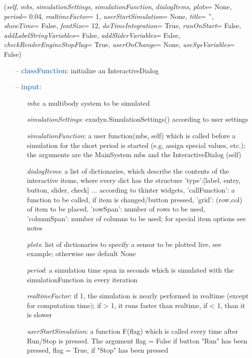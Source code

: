 \begin{itemize}[leftmargin=1.4cm]
\begin{itemize}[leftmargin=1.4cm]
\begin{itemize}[leftmargin=1.4cm]
\begin{itemize}[leftmargin=0.5cm]
\begin{itemize}[leftmargin=1.4cm]
\begin{itemize}[leftmargin=1.4cm]
\begin{itemize}[leftmargin=0.5cm]
\begin{itemize}[leftmargin=1.4cm]
\begin{itemize}[leftmargin=0.5cm]
\begin{itemize}[leftmargin=1.4cm]
\begin{itemize}[leftmargin=1.4cm]
\begin{flushleft}
({\it self}, {\it mbs}, {\it simulationSettings}, {\it simulationFunction}, {\it dialogItems}, {\it plots}= None, {\it period}= 0.04, {\it realtimeFactor}= 1, {\it userStartSimulation}= None, {\it title}= '', {\it showTime}= False, {\it fontSize}= 12, {\it doTimeIntegration}= True, {\it runOnStart}= False, {\it addLabelStringVariables}= False, {\it addSliderVariables}= False, {\it checkRenderEngineStopFlag}= True, {\it userOnChange}= None, {\it useSysVariables}= False)
\end{flushleft}
\setlength{\itemindent}{0.7cm}
\begin{itemize}[leftmargin=0.7cm]
\item[--]\textcolor{steelblue}{\bf classFunction}: initialize an InteractiveDialog
\item[--]\textcolor{steelblue}{\bf input}: \vspace{-6pt}
\begin{itemize}[leftmargin=1.2cm]
\setlength{\itemindent}{-0.7cm}
\item[]{\it mbs}: a multibody system to be simulated
\item[]{\it simulationSettings}: exudyn.SimulationSettings() according to user settings
\item[]{\it simulationFunction}: a user function(mbs, self) which is called before a simulation for the short period is started (e.g, assign special values, etc.); the arguments are the MainSystem mbs and the InteractiveDialog (self)
\item[]{\it dialogItems}: a list of dictionaries, which describe the contents of the interactive items, where every dict has the structure {'type':[label, entry, button, slider, check] ... according to tkinter widgets, 'callFunction': a function to be called, if item is changed/button pressed, 'grid': (row,col) of item to be placed, 'rowSpan': number of rows to be used, 'columnSpan': number of columns to be used; for special item options see notes}
\item[]{\it plots}: list of dictionaries to specify a sensor to be plotted live, see example; otherwise use default None
\item[]{\it period}: a simulation time span in seconds which is simulated with the simulationFunction in every iteration
\item[]{\it realtimeFactor}: if 1, the simulation is nearly performed in realtime (except for computation time); if > 1, it runs faster than realtime, if < 1, than it is slower
\item[]{\it userStartSimulation}: a function F(flag) which is called every time after Run/Stop is pressed. The argument flag = False if button "Run" has been pressed, flag = True, if "Stop" has been pressed

\end{itemize}
\end{itemize}
\end{itemize}
\end{itemize}
\end{itemize}
\end{itemize}
\end{itemize}
\end{itemize}
\end{itemize}
\end{itemize}
\end{itemize}
\end{itemize}
\end{itemize}
